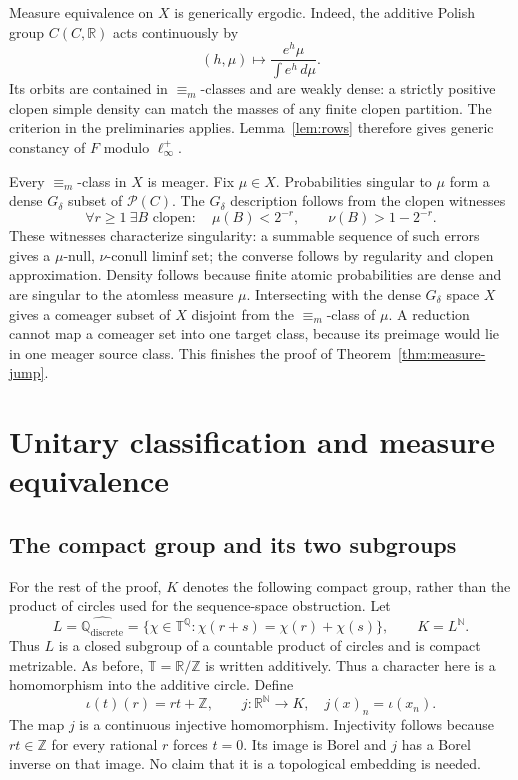 \documentclass[11pt]{article}
\numberwithin{equation}{section}
\theoremstyle{definition}
\newcommand{\N}{\mathbb N}
\newcommand{\R}{\mathbb R}
\newcommand{\Z}{\mathbb Z}
\newcommand{\T}{\mathbb T}
\newcommand{\Q}{\mathbb Q}
\newcommand{\Prob}{\mathcal P}
\newcommand{\meq}{\equiv_m}
\begin{document}
Measure equivalence on $X$ is generically ergodic.
Indeed, the additive Polish group $C(C,\R)$ acts continuously by
\[
 (h,\mu)\longmapsto \frac{e^h\mu}{\int e^h\,d\mu}.
\]
Its orbits are contained in $\meq$-classes and are weakly dense:
a strictly positive clopen simple density can match the masses of
any finite clopen partition. The criterion in the preliminaries applies.
Lemma~\ref{lem:rows} therefore gives generic constancy of $F$ modulo
$\ell_\infty^+$.

Every $\meq$-class in $X$ is meager. Fix $\mu\in X$.
Probabilities singular to $\mu$ form a dense $G_\delta$ subset of
$\Prob(C)$. The $G_\delta$ description follows from the clopen
witnesses
\[
 \forall r\ge1\ \exists B\text{ clopen}:\quad
       \mu(B)<2^{-r},\qquad \nu(B)>1-2^{-r}.
\]
These witnesses characterize singularity: a summable sequence of such
errors gives a $\mu$-null, $\nu$-conull liminf set; the converse follows
by regularity and clopen approximation.
Density follows because finite atomic probabilities are dense and are
singular to the atomless measure $\mu$.
Intersecting with the dense $G_\delta$ space $X$ gives a comeager subset
of $X$ disjoint from the $\meq$-class of $\mu$.
A reduction cannot map a comeager set into one target class, because
its preimage would lie in one meager source class.
This finishes the proof of Theorem~\ref{thm:measure-jump}.


\section{Unitary classification and measure equivalence}\label{sec:operators}
\subsection{The compact group and its two subgroups}\label{sec:groups}
For the rest of the proof, $K$ denotes the following compact group,
rather than the product of circles used for the sequence-space obstruction.
Let
\[
 L=\widehat{\Q_{\mathrm{discrete}}}
   =\{\chi\in\T^\Q:\chi(r+s)=\chi(r)+\chi(s)\},
 \qquad K=L^\N.
\]
Thus $L$ is a closed subgroup of a countable product of circles and is
compact metrizable. As before, $\T=\R/\Z$ is written additively. Thus a character here
is a homomorphism into the additive circle. Define
\[
 \iota(t)(r)=rt+\Z,\qquad
 j:\R^\N\longrightarrow K,\quad j(x)_n=\iota(x_n).
\]
The map $j$ is a continuous injective homomorphism. Injectivity follows
because $rt\in\Z$ for every rational $r$ forces $t=0$. Its image is
Borel and $j$ has a Borel inverse on that image. No claim that it is
a topological embedding is needed.
\end{document}
